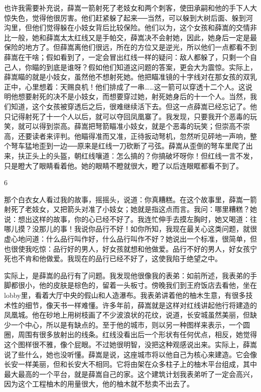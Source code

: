 也许我需要补充说，薛嵩一箭射死了老妓女和两个刺客，使田承嗣和他的手下人大惊失色，觉得他很厉害。他们赶紧躲了起来──当然，可以躲到大树后面、躲到河沟里，但他们觉得躲在小妓女背后比较保险。他们以为，这个女孩和薛嵩的交情非比一般，她和薛嵩太太红线又是手帕交，薛嵩决不会射她，因此，她身后一定是最保险的地方了。但薛嵩离他们很远，所在的方位又是逆光，所以他们一点都看不到薛嵩在干啥；假如看到了，一定会冒出红线一样的疑问：敌人都躲了，只剩一个自己人，你瞄的到底是谁呀？假如他们知道这问题的答案，更会大为震惊。实际上，薛嵩瞄的就是小妓女，虽然他不想射死她。他把瞄准镜的十字线对在那女孩的双乳正中，心里想着：天赐良机！他们排成了一串……这一箭可以穿透十二个人。这说明他想要射死的决不是小妓女，而想要穿过她，射死她身后的十一个人。当然，我们知道，这个女孩被穿透后之后，很难继续活下去。但这一点薛嵩已经忘记了。他只记得射死了十一个人以后，就可以夺回凤凰寨了。我发现，只要我开个恶毒的玩笑，就可以得到崇高。薛嵩把弩箭瞄准小妓女，就是个恶毒的玩笑；但崇高不崇高，还要读者来评判。他瞄得准而又准，正待扳动弩机，忽然听见砰地一声响，整个弩车猛地歪到一边──原来是红线一刀砍断了弓弦。薛嵩从歪倒的弩车里爬了出来，扶正头上的头盔，朝红线嚷道：怎么搞的？你搞破坏呀你！但红线一言不发，只是瞪大了眼睛看着他。她的眼睛不瞪就很大，瞪了以后连眼眶都看不到了。 

6 

那个白衣女人看过我的故事，摇摇头，说道：你真糟糕。在这个故事里，薛嵩一箭射死了老妓女，又把箭头对准了小妓女；她就是指这点而言。我问：哪里糟糕？她说：想出这样的故事，你的心已经不好了。我连忙伸手去摸左胸时，她又喝道：往哪儿摸？没那儿的事！我说你品行不好！如你所知，我现在最关心这类问题，就很虚心地问道：什么品行叫作好，什么品行叫作不好？她说出一个标准，很简单，但也很使我吃惊：品行好的男人，好女孩就想和他做爱。品行不好的男人，好女孩宁死也不肯和他做爱。我现在的品行已经不好了，这使我陷于绝望之中。 

实际上，是薛嵩的品行有了问题。我发现他很像我的表弟：如前所述，我表弟的手脚都很小，他的皮肤是棕色的，留着一头板寸。傍晚我们到王府饭店去看他，坐在lobby里，看着大厅中央的假山和人造瀑布。我表弟讲着他的柚木生意，有很多技术性的细节，像天书一样难懂。许多年前，薛嵩就是这样对红线讲起他行将建造的凤凰城。他在砂地上用树枝画了不少波浪状的花纹，说道，长安城虽然美丽，但缺少一个中心，所以是有缺点的。至于他的城市，则以另一种图样来表示，一个圆圈，周围有很多放射出的线条。红线没看出后一个形状有任何优点，相反，她觉得这个图样很不雅，像个屁眼。不过她很明智，没把这种观感说出来。实际上，薛嵩说了些什么，她也没听懂。薛嵩是说，这座城市将以他自己为核心来建造。它会像长安一样美丽，但和长安大不相同。它将由架在众多柱子上的柚木平台组成，其中最大最高的一个平台，就是薛嵩自己的家。这个建筑计划我表弟听了一定会高兴，因为这个工程柚木的用量很大，他的柚木就不愁卖不出去了。 

